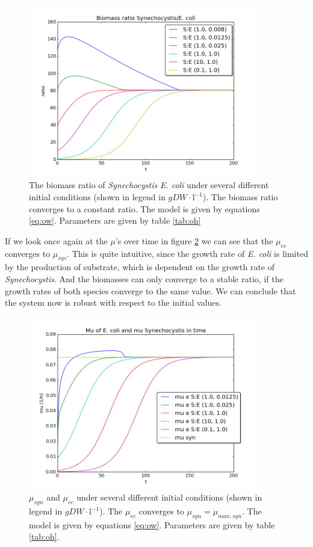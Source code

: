 \documentclass[12pt]{report}
\begin{document}
\begin{figure}[!ht]
 \begin{center}  
     \includegraphics[width=10cm]{independent_flask_ratios.png}
     \caption{The biomass ratio of \textit{Synechocystis} \textit{E. coli} under several different initial conditions (shown in legend in $gDW\cdot \text{l}^{-1}$). The biomass ratio converges to a constant ratio. The model is given by equations \ref{eq:ow}. Parameters are given by table \ref{tab:oh}}
    \label{fig:oneratio}
    \end{center}
\end{figure}

If we look once again at the $\mu$'s over time in figure \ref{fig:onemu} we can see that the $\mu_{ec}$ converges to $\mu_{sys}$. This is quite intuitive, since the growth rate of \textit{E. coli} is limited by the production of substrate, which is dependent on the growth rate of \textit{Synechocystis}. And the biomasses can only converge to a stable ratio, if the growth rates of both species converge to the same value. 
We can conclude that the system now is robust with respect to the initial values.

\begin{figure}[!ht]
 \begin{center}  
     \includegraphics[width=10cm]{independent_flask_mus.png}
     \caption{$\mu_{syn}$ and $\mu_{ec}$ under several different initial conditions (shown in legend in $gDW\cdot \text{l}^{-1}$). The $\mu_{ec}$ converges to $\mu_{syn}=\mu_{max,syn}$. The model is given by equations \ref{eq:ow}. Parameters are given by table \ref{tab:oh}.}
    \label{fig:onemu}
    \end{center}
\end{figure}
\end{document}
